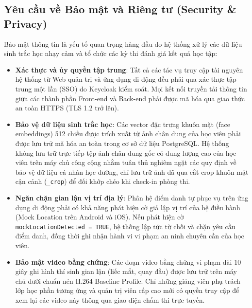 \documentclass[../DoAn.tex]{subfiles}
\begin{document}
\subsection{Yêu cầu về Bảo mật và Riêng tư (Security \& Privacy)}
Bảo mật thông tin là yếu tố quan trọng hàng đầu do hệ thống xử lý các dữ liệu sinh trắc học nhạy cảm và tổ chức các kỳ thi đánh giá kết quả học tập:
\begin{itemize}
    \item \textbf{Xác thực và ủy quyền tập trung}: Tất cả các tác vụ truy cập tài nguyên hệ thống từ Web quản trị và ứng dụng di động đều phải qua xác thực tập trung một lần (SSO) do Keycloak \cite{keycloak2026} kiểm soát. Mọi kết nối truyền tải thông tin giữa các thành phần Front-end và Back-end phải được mã hóa qua giao thức an toàn HTTPS (TLS 1.2 trở lên).
    \item \textbf{Bảo vệ dữ liệu sinh trắc học}: Các vector đặc trưng khuôn mặt (face embeddings) 512 chiều được trích xuất từ ảnh chân dung của học viên phải được lưu trữ mã hóa an toàn trong cơ sở dữ liệu PostgreSQL. Hệ thống không lưu trữ trực tiếp tệp ảnh chân dung gốc có dung lượng cao của học viên trên máy chủ công cộng nhằm tuân thủ nghiêm ngặt các quy định về bảo vệ dữ liệu cá nhân học đường, chỉ lưu trữ ảnh đã qua cắt crop khuôn mặt cận cảnh (\mbox{\texttt{\_crop}}) để đối khớp chéo khi check-in phòng thi.
    \item \textbf{Ngăn chặn gian lận vị trí địa lý}: Phân hệ điểm danh tự phục vụ trên ứng dụng di động phải có khả năng phát hiện cờ giả lập vị trí của hệ điều hành (Mock Location trên Android và iOS). Nếu phát hiện cờ \texttt{mockLocationDetected = TRUE}, hệ thống lập tức từ chối và chặn yêu cầu điểm danh, đồng thời ghi nhận hành vi vi phạm an ninh chuyên cần của học viên.
    \item \textbf{Bảo mật video bằng chứng}: Các đoạn video bằng chứng vi phạm dài 10 giây ghi hình thí sinh gian lận (liếc mắt, quay đầu) được lưu trữ trên máy chủ dưới chuẩn nén H.264 Baseline Profile. Chỉ những giảng viên phụ trách lớp học phần tương ứng và quản trị viên cấp cao mới có quyền truy cập để xem lại các video này thông qua giao diện chấm thi trực tuyến.
\end{itemize}
\end{document}
